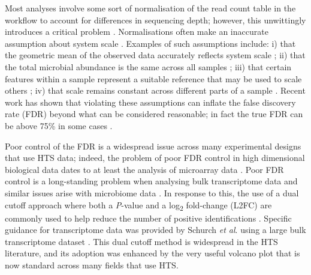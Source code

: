 \documentclass[10pt,letterpaper]{article}
\begin{document}
Most analyses involve some sort of normalisation of the read count table in the workflow to account for differences in sequencing depth; however, this unwittingly introduces a critical problem \cite{weiss_normalization_2017}. Normalisations often make an inaccurate assumption about system scale \cite{nixon_scale_2024, nixon_incorporating_2025, gloor_explicit_2025}. Examples of such assumptions include: i) that the geometric mean of the observed data accurately reflects system scale \cite{aitchison_statistical_1986}; ii) that the total microbial abundance is the same across all samples \cite{hughes_rarefaction_2005}; iii) that certain features within a sample represent a suitable reference that may be used to scale others \cite{robinson_scaling_2010,vandesompele_accurate_2002}; iv) that scale remains constant across different parts of a sample \cite{anders_2010_differential}. Recent work has shown that violating these assumptions can inflate the false discovery rate (FDR) beyond what can be considered reasonable; in fact the true FDR can be above 75\% in some cases \cite{li_exaggerated_2022,konnaris_uncertainty_2025,nixon_incorporating_2025,gloor_explicit_2025}.

Poor control of the FDR is a widespread issue across many experimental designs that use HTS data; indeed, the problem of poor FDR control in high dimensional biological data dates to at least the analysis of microarray data \cite{Cui:2003aa}. Poor FDR control is a long-standing problem when analysing bulk transcriptome data \cite{Soneson:2013, li_exaggerated_2022} and similar issues arise with microbiome data \cite{hawinkel2017, Nearing:2022aa}. In response to this, the use of a dual cutoff approach where both a \textit{P}-value and a log\textsubscript{2} fold-change (L2FC) are commonly used to help reduce the number of positive identifications \cite{Cui:2003aa}. Specific guidance for transcriptome data was provided by Schurch \textit{et al}. using a large bulk transcriptome dataset \cite{schurch_how_2016}. This dual cutoff method is widespread in the HTS literature, and its adoption was enhanced by the very useful volcano plot \cite{Cui:2003aa} that is now standard across many fields that use HTS.
\end{document}
